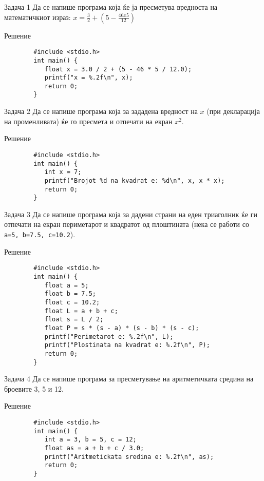 \begin{frame}[fragile]{Задача 1}
	Да се напише програма која ќе ја пресметува вредноста на математичкиот израз:
	$ x = \frac{3}{2} + (5 - \frac{46 x 5}{12})$
	\begin{exampleblock}{Решение}
		\begin{lstlisting}
		#include <stdio.h>
		int main() {
		   float x = 3.0 / 2 + (5 - 46 * 5 / 12.0);
		   printf("x = %.2f\n", x);
		   return 0;
		}
		\end{lstlisting}
	\end{exampleblock}
\end{frame}

\begin{frame}[fragile]{Задача 2}
Да се напише програма која за зададена вредност на $ x $ (при декларација на променливата) ќе го пресмета и отпечати на екран $ x^2 $.
	\begin{exampleblock}{Решение}
		\begin{lstlisting}
		#include <stdio.h>
		int main() {
		   int x = 7;
		   printf("Brojot %d na kvadrat e: %d\n", x, x * x);
		   return 0;
		}
		\end{lstlisting}
	\end{exampleblock}
\end{frame}

\begin{frame}[fragile]{Задача 3}
Да се напише програма која за дадени страни на еден триаголник ќе ги отпечати на екран периметарот 
и квадратот од плоштината (нека се работи со \texttt{a=5, b=7.5, c=10.2}).
	\begin{exampleblock}{Решение}
		\begin{lstlisting}
		#include <stdio.h>
		int main() {
		   float a = 5;
		   float b = 7.5;
		   float c = 10.2;
		   float L = a + b + c;
		   float s = L / 2;
		   float P = s * (s - a) * (s - b) * (s - c);
		   printf("Perimetarot e: %.2f\n", L);
		   printf("Plostinata na kvadrat e: %.2f\n", P);
		   return 0;
		}
		\end{lstlisting}
	\end{exampleblock}
\end{frame}

\begin{frame}[fragile]{Задача 4}
Да се напише програма за пресметување на аритметичката средина на броевите 3, 5 и 12.
	\begin{exampleblock}{Решение}
		\begin{lstlisting}
		#include <stdio.h>
		int main() {
		   int a = 3, b = 5, c = 12;
		   float as = a + b + c / 3.0;
		   printf("Aritmetickata sredina e: %.2f\n", as);
		   return 0;
		}
		\end{lstlisting}
	\end{exampleblock}
\end{frame}

